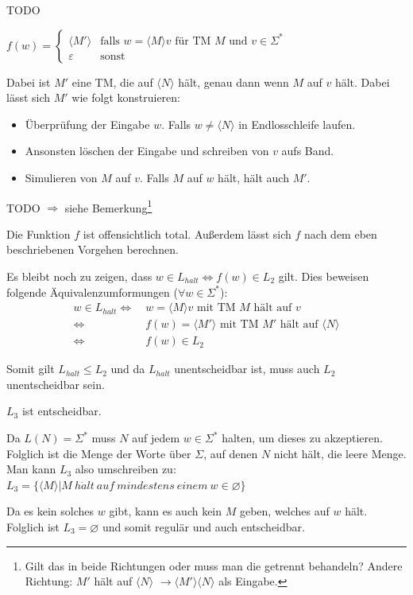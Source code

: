 \begin{teile}
	TODO

	$f(w)=\begin{cases}
		\langle M' \rangle &\text{falls $w=\langle M \rangle v$ für TM $M$ und $v \in \Sigma^*$}\\
		\varepsilon &\text{sonst}
	\end{cases}$

	Dabei ist $M'$ eine TM, die auf $\langle N \rangle$ hält, genau dann wenn $M$ auf $v$ hält. Dabei lässt sich $M'$ wie folgt konstruieren:
	\begin{itemize}
		\item Überprüfung der Eingabe $w$. Falls $w \neq \langle N \rangle$ in Endlosschleife laufen.
		\item Ansonsten löschen der Eingabe und schreiben von $v$ aufs Band.
		\item Simulieren von $M$ auf $v$. Falls $M$ auf $w$ hält, hält auch $M'$.
	\end{itemize}

	TODO $\Rightarrow$ siehe Bemerkung\footnote[1]{Gilt das in beide Richtungen oder muss man die getrennt behandeln? Andere Richtung: $M'$ hält auf $\langle N \rangle$ $\rightarrow \langle M' \rangle \langle N \rangle$ als Eingabe.}
	
	Die Funktion $f$ ist offensichtlich total. Außerdem lässt sich $f$ nach dem eben beschriebenen Vorgehen berechnen.

	Es bleibt noch zu zeigen, dass $w \in L_{halt} \Leftrightarrow f(w) \in L_2$ gilt. Dies beweisen folgende Äquivalenzumformungen ($\forall w \in \Sigma^*$):
	\begin{align*}
		w \in L_{halt} \Longleftrightarrow\ &w = \langle M \rangle v \text{ mit TM } M \text{ hält auf } v \\
		\Leftrightarrow\ &f(w) = \langle M' \rangle \text{ mit TM } M' \text{ hält auf } \langle N \rangle \\
		\Leftrightarrow\ &f(w) \in L_2
	\end{align*}

	Somit gilt $L_{halt} \leq L_2$ und da $L_{halt}$ unentscheidbar ist, muss auch $L_2$ unentscheidbar sein.

	
	\item
	$L_3$ ist entscheidbar.

	Da $L(N)=\Sigma^*$ muss $N$ auf jedem $w \in \Sigma^*$ halten, um dieses zu akzeptieren. Folglich ist die Menge der Worte über $\Sigma$, auf denen $N$ nicht hält, die leere Menge. Man kann $L_3$ also umschreiben zu:\\
	$L_3= \{\langle M\rangle | M\ h\ddot{a}lt\ auf\ mindestens\ einem\ w \in \varnothing \}$

	Da es kein solches $w$ gibt, kann es auch kein $M$ geben, welches auf $w$ hält. Folglich ist $L_3 = \varnothing$ und somit regulär und auch entscheidbar. 
	
\end{teile}


